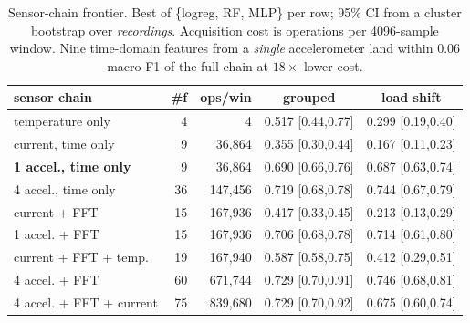 \begin{table}[t]
\centering\footnotesize\setlength{\tabcolsep}{3.2pt}
\caption{Sensor-chain frontier. Best of \{logreg, RF, MLP\} per row;
95\% CI from a cluster bootstrap over \emph{recordings}. Acquisition cost is
operations per 4096-sample window. Nine time-domain features from a
\emph{single} accelerometer land within $0.06$ macro-F1 of the full chain at
$18\times$ lower cost.}
\label{tab:frontier}
\begin{tabular}{lrrcc}
\toprule
sensor chain & \#f & ops/win & grouped & load shift \\
\midrule
temperature only & 4 & 4 & 0.517 \tiny[0.44,0.77] & 0.299 \tiny[0.19,0.40] \\
current, time only & 9 & 36,864 & 0.355 \tiny[0.30,0.44] & 0.167 \tiny[0.11,0.23] \\
\textbf{1 accel., time only} & 9 & 36,864 & 0.690 \tiny[0.66,0.76] & 0.687 \tiny[0.63,0.74] \\
4 accel., time only & 36 & 147,456 & 0.719 \tiny[0.68,0.78] & 0.744 \tiny[0.67,0.79] \\
current + FFT & 15 & 167,936 & 0.417 \tiny[0.33,0.45] & 0.213 \tiny[0.13,0.29] \\
1 accel. + FFT & 15 & 167,936 & 0.706 \tiny[0.68,0.78] & 0.714 \tiny[0.61,0.80] \\
current + FFT + temp. & 19 & 167,940 & 0.587 \tiny[0.58,0.75] & 0.412 \tiny[0.29,0.51] \\
4 accel. + FFT & 60 & 671,744 & 0.729 \tiny[0.70,0.91] & 0.746 \tiny[0.68,0.81] \\
4 accel. + FFT + current & 75 & 839,680 & 0.729 \tiny[0.70,0.92] & 0.675 \tiny[0.60,0.74] \\
\bottomrule
\end{tabular}
\end{table}
